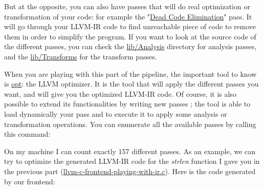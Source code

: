\documentclass[a4paper, 11pt, notitlepage]{report}
\begin{document}
But at the opposite, you can also have passes that will do real optimization or transformation of your code: for example the "\href{https://llvm.org/viewvc/llvm-project/llvm/trunk/lib/Transforms/Scalar/DCE.cpp?view=markup}{Dead Code Elimination}" pass. It will go through your LLVM-IR code to find unreachable piece of code to remove them in order to simplify the program. If you want to look at the source code of the different passes, you can check the \href{https://llvm.org/viewvc/llvm-project/llvm/trunk/lib/Analysis/}{lib/Analysis} directory for analysis passes, and the \href{https://llvm.org/viewvc/llvm-project/llvm/trunk/lib/Transforms/}{lib/Transforms} for the transform passes.

When you are playing with this part of the pipeline, the important tool to know is \href{http://llvm.org/docs/CommandGuide/opt.html}{opt}: the LLVM optimizer. It is the tool that will apply the different passes you want, and will give you the optimized LLVM-IR code. Of course, it is also possible to extend its functionalities by writing new passes ; the tool is able to load dynamically your pass and to execute it to apply some analysis or transformation operations. You can enumerate all the available passes by calling this command:

On my machine I can count exactly 157 different passes. As an example, we can try to optimize the generated LLVM-IR code for the \textit{strlen} function I gave you in the previous part (\href{https://github.com/0vercl0k/stuffz/blob/master/llvm-funz/llvm-c-frontend-playing-with-ir.c}{llvm-c-frontend-playing-with-ir.c}). Here is the code generated by our frontend:
\end{document}
